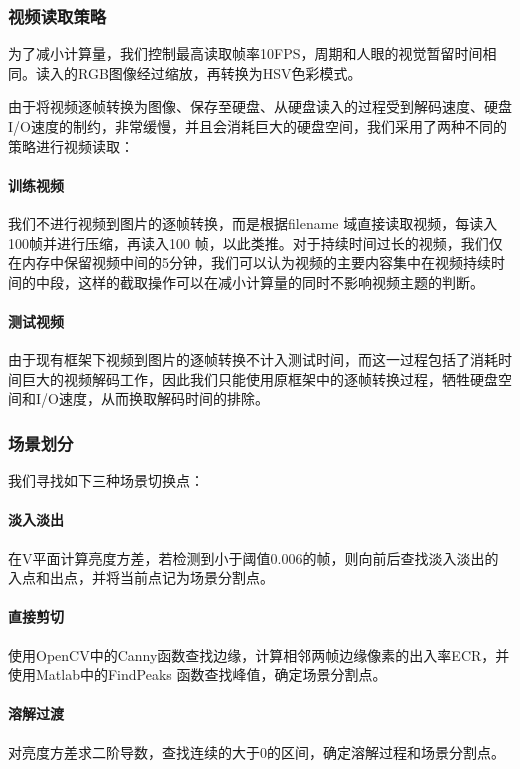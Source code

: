 \documentclass{article}
\begin{document}
\begin{multicols}{2}
            \subsubsection{视频读取策略}
                为了减小计算量，我们控制最高读取帧率10FPS，周期和人眼的视觉暂留时间相同。读入的RGB图像经过缩放，再转换为HSV色彩模式。

                由于将视频逐帧转换为图像、保存至硬盘、从硬盘读入的过程受到解码速度、硬盘I/O速度的制约，非常缓慢，并且会消耗巨大的硬盘空间，我们采用了两种不同的策略进行视频读取：

                \paragraph{训练视频}
                我们不进行视频到图片的逐帧转换，而是根据filename 域直接读取视频，每读入100帧并进行压缩，再读入100 帧，以此类推。对于持续时间过长的视频，我们仅在内存中保留视频中间的5分钟，我们可以认为视频的主要内容集中在视频持续时间的中段，这样的截取操作可以在减小计算量的同时不影响视频主题的判断。

                \paragraph{测试视频}
                由于现有框架下视频到图片的逐帧转换不计入测试时间，而这一过程包括了消耗时间巨大的视频解码工作，因此我们只能使用原框架中的逐帧转换过程，牺牲硬盘空间和I/O速度，从而换取解码时间的排除。

            \subsubsection{场景划分}
                我们寻找如下三种场景切换点：

                \paragraph{淡入淡出}
                在V平面计算亮度方差，若检测到小于阈值0.006的帧，则向前后查找淡入淡出的入点和出点，并将当前点记为场景分割点。

                \paragraph{直接剪切}
                使用OpenCV中的Canny函数查找边缘，计算相邻两帧边缘像素的出入率ECR，并使用Matlab中的FindPeaks 函数查找峰值，确定场景分割点。

                \paragraph{溶解过渡}
                对亮度方差求二阶导数，查找连续的大于0的区间，确定溶解过程和场景分割点。


\end{multicols}
\end{document}
